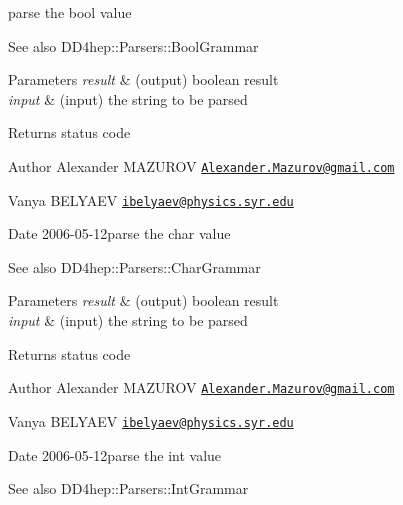parse the {\ttfamily bool} value 

\begin{DoxySeeAlso}{See also}
D\+D4hep\+::\+Parsers\+::\+Bool\+Grammar 
\end{DoxySeeAlso}

\begin{DoxyParams}{Parameters}
{\em result} & (output) boolean result \\
\hline
{\em input} & (input) the string to be parsed \\
\hline
\end{DoxyParams}
\begin{DoxyReturn}{Returns}
status code
\end{DoxyReturn}
\begin{DoxyAuthor}{Author}
Alexander M\+A\+Z\+U\+R\+OV \href{mailto:Alexander.Mazurov@gmail.com}{\tt Alexander.\+Mazurov@gmail.\+com} 

Vanya B\+E\+L\+Y\+A\+EV \href{mailto:ibelyaev@physics.syr.edu}{\tt ibelyaev@physics.\+syr.\+edu} 
\end{DoxyAuthor}
\begin{DoxyDate}{Date}
2006-\/05-\/12parse the {\ttfamily char} value 
\end{DoxyDate}
\begin{DoxySeeAlso}{See also}
D\+D4hep\+::\+Parsers\+::\+Char\+Grammar 
\end{DoxySeeAlso}

\begin{DoxyParams}{Parameters}
{\em result} & (output) boolean result \\
\hline
{\em input} & (input) the string to be parsed \\
\hline
\end{DoxyParams}
\begin{DoxyReturn}{Returns}
status code
\end{DoxyReturn}
\begin{DoxyAuthor}{Author}
Alexander M\+A\+Z\+U\+R\+OV \href{mailto:Alexander.Mazurov@gmail.com}{\tt Alexander.\+Mazurov@gmail.\+com} 

Vanya B\+E\+L\+Y\+A\+EV \href{mailto:ibelyaev@physics.syr.edu}{\tt ibelyaev@physics.\+syr.\+edu} 
\end{DoxyAuthor}
\begin{DoxyDate}{Date}
2006-\/05-\/12parse the {\ttfamily int} value 
\end{DoxyDate}
\begin{DoxySeeAlso}{See also}
D\+D4hep\+::\+Parsers\+::\+Int\+Grammar 
\end{DoxySeeAlso}

